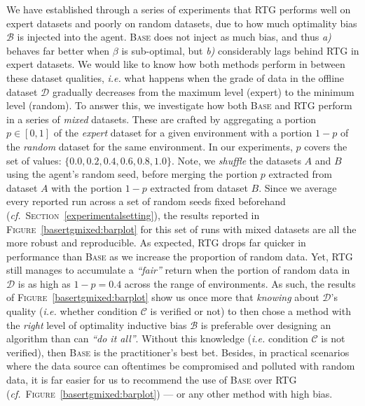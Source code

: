 We have established through a series of experiments that RTG performs well on expert datasets and
poorly on random datasets, due to how much optimality bias $\mathcal{B}$ is injected into the agent.
\textsc{Base} does not inject as much bias, and thus
\textit{a)} behaves far better when $\beta$ is sub-optimal,
but \textit{b)} considerably lags behind RTG in expert datasets.
We would like to know how both methods perform in between these dataset qualities, \textit{i.e.}
what happens when the grade of data in the offline dataset $\mathcal{D}$ gradually decreases from
the maximum level (expert) to the minimum level (random).
To answer this, we investigate how both \textsc{Base} and RTG perform
in a series of \emph{mixed} datasets.
These are crafted by aggregating a portion $p \in [0,1]$ of the \emph{expert} dataset
for a given environment with a portion $1-p$ of the \emph{random} dataset for the same environment.
In our experiments, $p$ covers the set of values: $\{0.0,0.2,0.4,0.6,0.8,1.0\}$.
Note, we \emph{shuffle} the datasets $A$ and $B$ using the agent's random seed,
before merging the portion $p$ extracted from dataset $A$ with the portion $1-p$ extracted from dataset $B$.
Since we average every reported run across a set of random seeds fixed beforehand
(\textit{cf.}~\textsc{Section}~\ref{experimentalsetting}),
the results reported
in \textsc{Figure}~\ref{basertgmixed:barplot}
for this set of runs with mixed datasets are all the more robust
and reproducible.
As expected, RTG drops far quicker in performance than \textsc{Base} as we increase
the proportion of random data.
Yet, RTG still manages to accumulate a \textit{``fair''} return when the portion of random data in $\mathcal{D}$
is as high as $1-p = 0.4$ across the range of environments.
As such, the results of \textsc{Figure}~\ref{basertgmixed:barplot} show us once more that
\emph{knowing} about $\mathcal{D}$'s quality (\textit{i.e.} whether condition $\mathcal{C}$ is verified or not)
to then chose a method with the \emph{right} level of optimality inductive bias $\mathcal{B}$
is preferable over designing an algorithm than can \textit{``do it all''}.
Without this knowledge (\textit{i.e.} condition $\mathcal{C}$ is not verified),
then \textsc{Base} is the practitioner's best bet.
Besides, in practical scenarios where the data source can oftentimes be compromised and polluted with random data,
it is far easier for us to recommend the use of \textsc{Base} over RTG
(\textit{cf.}~\textsc{Figure}~\ref{basertgmixed:barplot}) --- or any other method with high bias.

